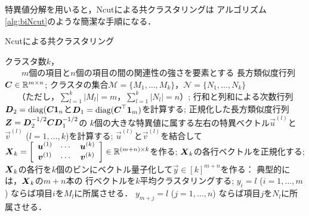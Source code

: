 特異値分解を用いると，Ncutによる共クラスタリングは
アルゴリズム\ref{alg:biNcut}のような簡潔な手順になる．
\begin{algorithm}[t]
\caption{Ncutによる共クラスタリング}
\label{alg:biNcut}
\begin{algorithmic}[1]
\REQUIRE
クラスタ数$k$，\\
　　$m$個の項目と$n$個の項目の間の関連性の強さを要素とする
長方類似度行列$\mtr C\in\mathbb{R}^{m\times n}$;
\ENSURE クラスタの集合$\mathcal{M}=\{ M_1,\dots,M_k \}$，$\mathcal{N}=\{ N_1,\dots,N_k \}$\\
　　（ただし，$\sum_{l=1}^k|M_l|=m$，$\sum_{l=1}^k|N_l|=n$）;
\STATE
行和と列和による次数行列$\mtr D_2=\diag(\mtr C\vec 1_n$と$\mtr D_1=\diag(\mtr C^\top\vec 1_m)$を計算する;
\STATE
正規化した長方類似度行列$\mtr Z=\mtr D_2^{-1/2}\mtr C\mtr D_1^{-1/2}$の
$k$個の大きな特異値に属する左右の特異ベクトル$\vec u^{(l)}$と$\vec v^{(l)}$ ($l=1,\dots,k$)を計算する;
\STATE
$\vec u^{(l)}$と$\vec v^{(l)}$を結合して
$\mtr X_k=\bmatrix{ccc}{\vec u^{(1)} & \cdots & \vec u^{(k)}\\ \vec v^{(1)} & \cdots & \vec v^{(k)}}\in\mathbb{R}^{(m+n)\times k}$を作る;
\STATE
$\mtr X_k$の各行ベクトルを正規化する;
\STATE
$\mtr X_k$の各行を$k$個のビンにベクトル量子化して$\vec y\in[k]^{m+n}$を作る：
典型的には，$\mtr X_k$の$m+n$本の
行ベクトルを$k$平均クラスタリングする;
\STATE
$y_i=l$ ($i=1,\dots,m$) ならば項目$i$を$M_l$に所属させる．
\STATE
$y_{m+j}=l$ ($j=1,\dots,n$) ならば項目$j$を$N_l$に所属させる．
\end{algorithmic}
\end{algorithm}



